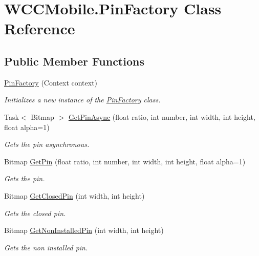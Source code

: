 \hypertarget{class_w_c_c_mobile_1_1_pin_factory}{}\section{W\+C\+C\+Mobile.\+Pin\+Factory Class Reference}
\label{class_w_c_c_mobile_1_1_pin_factory}
\subsection*{Public Member Functions}
\begin{DoxyCompactItemize}
\item 
\hyperlink{class_w_c_c_mobile_1_1_pin_factory_a9cdce812f6e1468f5dbcd98aa040ed88}{Pin\+Factory} (Context context)
\begin{DoxyCompactList}\small\item\em Initializes a new instance of the \hyperlink{class_w_c_c_mobile_1_1_pin_factory}{Pin\+Factory} class. \end{DoxyCompactList}\item 
Task$<$ Bitmap $>$ \hyperlink{class_w_c_c_mobile_1_1_pin_factory_aae85d3f9dc2977847b09ffa518c2d310}{Get\+Pin\+Async} (float ratio, int number, int width, int height, float alpha=1)
\begin{DoxyCompactList}\small\item\em Gets the pin asynchronous. \end{DoxyCompactList}\item 
Bitmap \hyperlink{class_w_c_c_mobile_1_1_pin_factory_ac8c67ab242a0a5eec6457a19c2e6e13d}{Get\+Pin} (float ratio, int number, int width, int height, float alpha=1)
\begin{DoxyCompactList}\small\item\em Gets the pin. \end{DoxyCompactList}\item 
Bitmap \hyperlink{class_w_c_c_mobile_1_1_pin_factory_af897a9f6b508c9c8c477fc53f8b511d6}{Get\+Closed\+Pin} (int width, int height)
\begin{DoxyCompactList}\small\item\em Gets the closed pin. \end{DoxyCompactList}\item 
Bitmap \hyperlink{class_w_c_c_mobile_1_1_pin_factory_a071950de5ffa2f0070a3eb8beca79c31}{Get\+Non\+Installed\+Pin} (int width, int height)
\begin{DoxyCompactList}\small\item\em Gets the non installed pin. \end{DoxyCompactList}\end{DoxyCompactItemize}


